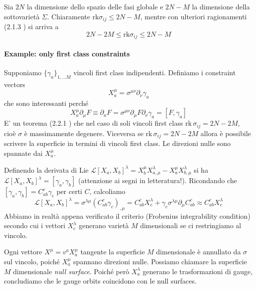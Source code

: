 \documentclass[a4paper, 11pt]{article}
\begin{document}
	Sia $2N$ la dimensione dello spazio delle fasi globale e $2N-M$ la dimensione della sottovarietà $\Sigma$. Chiaramente $\mathrm{rk} \sigma_{ij} \le 2N-M$,	mentre con ulteriori ragionamenti (2.1.3 \cite{HT}) si arriva a
	\[ 2N-2M \le \mathrm{rk} \sigma_{ij} \le 2N-M \]
	
	\paragraph{Example: only first class constraints} Supponiamo $\{\gamma_a\}_{1,\dots M}$ vincoli first class indipendenti. Definiamo i constraint vectors
	\[ X^\mu_a = \sigma^{\mu\nu} \partial_\nu \gamma_a \]
	che sono interessanti perché
	\[ X^\mu_a \partial_\mu F \equiv \partial_a F = \sigma^{\mu\nu} \partial_\mu F \partial_\nu \gamma_a = [F, \gamma_a] \]
	E' un teorema (2.2.1 \cite{HT}) che nel caso di soli vincoli first class $\mathrm{rk}\,\sigma_{ij} = 2N-2M$, cioè $\sigma$ è massimamente degenere. Viceversa se $\mathrm{rk}\,\sigma_{ij} = 2N-2M$ allora è possibile scrivere la superficie in termini di vincoli first class. Le direzioni nulle sono spannate dai $X^\mu_a$.
	\vspace{3mm}
	
	Definendo la derivata di Lie $\mathcal{L}[X_a, X_b]^\lambda = X^\mu_bX^\lambda_{a,\mu} - X^\mu_aX^\lambda_{b,\mu} $ si ha $\mathcal{L}[X_a, X_b]^\lambda = [\gamma_a, \gamma_b]$ (attenzione ai segni in letteratura!). Ricondando che $[\gamma_a, \gamma_b] = C_{ab}^c\gamma_c$ per certi $C$, calcoliamo
	\[ \mathcal{L}[X_a, X_b]^\lambda = \sigma^{\lambda\mu} (C_{ab}^c \gamma_c)_{,\mu} = C_{ab}^c X^\lambda_c + \gamma_c \sigma^{\lambda\mu} \partial_\mu C_{ab}^c \approx C_{ab}^c X^\lambda_c \]
	Abbiamo in realtà appena verificato il criterio (Frobenius integrability condition) secondo cui i vettori $X^\lambda_c$ generano varietà $M$ dimensionali se ci restringiamo al vincolo.
	
	Ogni vettore $X^\mu = v^a X^\mu_a$ tangente la superficie $M$ dimensionale è annullato da $\sigma$ sul vincolo, poiché $X^\mu_a$ spannano direzioni nulle. Possiamo chiamare la superficie $M$ dimensionale \emph{null surface}. Poiché però $X^\lambda_a$ generano le trasformazioni di gauge, concludiamo che le gauge orbits coincidono con le null surfaces.
	
\end{document}
